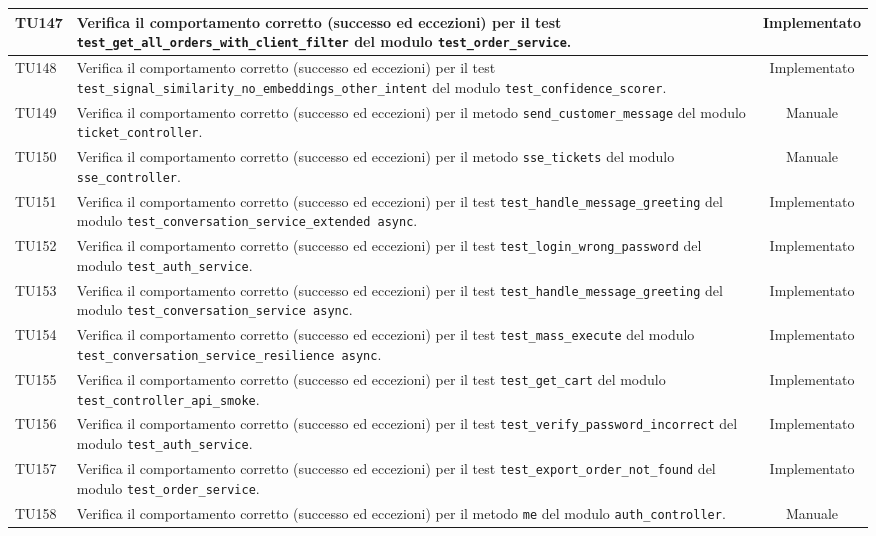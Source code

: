 \documentclass[a4paper,11pt,oneside]{scrartcl}
\begin{document}
\begin{longtable}{|p{1.9cm}|p{11.6cm}|c|}
    TU147 & Verifica il comportamento corretto (successo ed eccezioni) per il test \texttt{test\_get\_all\_orders\_with\_client\_filter} del modulo \texttt{test\_order\_service}. & Implementato \\ \hline
    TU148 & Verifica il comportamento corretto (successo ed eccezioni) per il test \texttt{test\_signal\_similarity\_no\_embeddings\_other\_intent} del modulo \texttt{test\_confidence\_scorer}. & Implementato \\ \hline
    TU149 & Verifica il comportamento corretto (successo ed eccezioni) per il metodo \texttt{send\_customer\_message} del modulo \texttt{ticket\_controller}. & Manuale \\ \hline
    TU150 & Verifica il comportamento corretto (successo ed eccezioni) per il metodo \texttt{sse\_tickets} del modulo \texttt{sse\_controller}. & Manuale \\ \hline
    TU151 & Verifica il comportamento corretto (successo ed eccezioni) per il test \texttt{test\_handle\_message\_greeting} del modulo \texttt{test\_conversation\_service\_extended async}. & Implementato \\ \hline
    TU152 & Verifica il comportamento corretto (successo ed eccezioni) per il test \texttt{test\_login\_wrong\_password} del modulo \texttt{test\_auth\_service}. & Implementato \\ \hline
    TU153 & Verifica il comportamento corretto (successo ed eccezioni) per il test \texttt{test\_handle\_message\_greeting} del modulo \texttt{test\_conversation\_service     async}. & Implementato \\ \hline
    TU154 & Verifica il comportamento corretto (successo ed eccezioni) per il test \texttt{test\_mass\_execute} del modulo \texttt{test\_conversation\_service\_resilience async}. & Implementato \\ \hline
    TU155 & Verifica il comportamento corretto (successo ed eccezioni) per il test \texttt{test\_get\_cart} del modulo \texttt{test\_controller\_api\_smoke}. & Implementato \\ \hline
    TU156 & Verifica il comportamento corretto (successo ed eccezioni) per il test \texttt{test\_verify\_password\_incorrect} del modulo \texttt{test\_auth\_service}. & Implementato \\ \hline
    TU157 & Verifica il comportamento corretto (successo ed eccezioni) per il test \texttt{test\_export\_order\_not\_found} del modulo \texttt{test\_order\_service}. & Implementato \\ \hline
    TU158 & Verifica il comportamento corretto (successo ed eccezioni) per il metodo \texttt{me} del modulo \texttt{auth\_controller}. & Manuale \\ \hline

\end{longtable}
\end{document}
